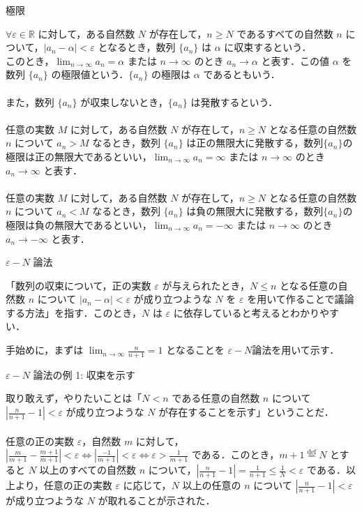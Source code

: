 \documentclass[a4paper]{ltjsarticle}
\begin{document}
\begin{tcb}{極限}{}

$\forall \varepsilon \in \mathbb{R}$ に対して，ある自然数 $N$ が存在して，$n \geq N$ であるすべての自然数 $n$ について，$|a_n - \alpha| < \varepsilon$ となるとき，数列 $\{a_n\}$ は $\alpha$ に収束するという．\\
このとき，$\lim_{n \to \infty} a_n = \alpha$ または $n \to \infty$ のとき $a_n \to \alpha$ と表す．この値 $\alpha$ を数列 $\{a_n\}$ の極限値という．$\{a_n\}$ の極限は $\alpha$ であるともいう．\\
\\
また，数列 $\{a_n\}$ が収束しないとき，$\{a_n\}$ は発散するという．\\
\\
任意の実数 $M$ に対して，ある自然数 $N$ が存在して，$n \geq N$ となる任意の自然数 $n$ について $a_n > M$ なるとき，数列 $\{a_n\}$ は正の無限大に発散する，数列$\{a_n\}$の極限は正の無限大であるといい，$\lim_{n \to \infty} a_n = \infty$ または $n \to \infty$ のとき $a_n \to \infty$ と表す．\\
\\
任意の実数 $M$ に対して，ある自然数 $N$ が存在して，$n \geq N$ となる任意の自然数 $n$ について $a_n < M$ なるとき，数列 $\{a_n\}$ は負の無限大に発散する，数列$\{a_n\}$の極限は負の無限大であるといい，$\lim_{n \to \infty} a_n = -\infty$ または $n \to \infty$ のとき $a_n \to -\infty$ と表す．

\end{tcb}

\begin{tcb}{$\varepsilon - N$ 論法}{}

「数列の収束について，正の実数 $\varepsilon$ が与えられたとき，$N \leq n$ となる任意の自然数 $n$ について $|a_n - \alpha| < \varepsilon$ が成り立つような $N$ を $\varepsilon$ を用いて作ることで議論する方法」を指す．このとき，$N$ は $\varepsilon$ に依存していると考えるとわかりやすい． 

\end{tcb}
手始めに，まずは $\lim_{n \to \infty} \frac{n}{n + 1} = 1$ となることを $\varepsilon - N $論法を用いて示す． 

\begin{tcb}{$\varepsilon - N$ 論法の例 1: 収束を示す}{}

取り敢えず，やりたいことは「$N < n$ である任意の自然数 $n$ について $|\frac{n}{n + 1} - 1| < \varepsilon$ が成り立つような $N$ が存在することを示す」ということだ．
\\
\\
任意の正の実数 $\varepsilon$，自然数 $m$ に対して，$|\frac{m}{m + 1} - \frac{m + 1}{m + 1}| < \varepsilon \Leftrightarrow |\frac{-1}{m + 1}| < \varepsilon \Leftrightarrow  \varepsilon  > \frac{1}{m + 1}$ である．このとき，$m + 1 \stackrel{\mathrm{def}}{=} N$ とすると $N$ 以上のすべての自然数 $n$ について，$|\frac{n}{n + 1} - 1| = \frac{1}{n + 1} \leq \frac{1}{N} < \varepsilon$ である．以上より，任意の正の実数 $\varepsilon$ に応じて，$N$ 以上の任意の $n$ について $|\frac{n}{n + 1} - 1| < \varepsilon$ が成り立つような $N$ が取れることが示された．

\end{tcb}
\end{document}
